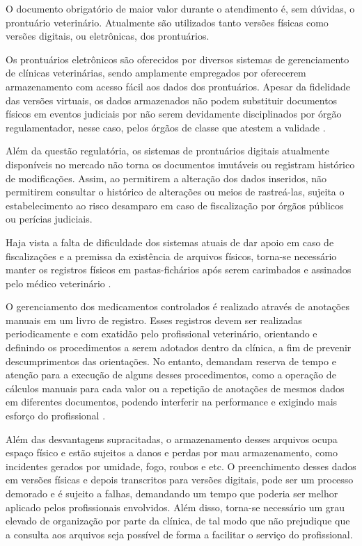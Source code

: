 \documentclass[
    12pt,               %
    openright,          %
    oneside,
    a4paper,            %
    BIBLATEX,           %
    TODO,               %
    english,            %
    brazil              %
    ]{ifsp-spo-inf-ctds}
\begin{document}
    O documento obrigatório de maior valor durante o atendimento é, sem dúvidas, o prontuário veterinário. Atualmente são utilizados tanto versões físicas como versões digitais, ou eletrônicas, dos prontuários.
    
    Os prontuários eletrônicos são oferecidos por diversos sistemas de gerenciamento de clínicas veterinárias, sendo amplamente empregados por oferecerem armazenamento com acesso fácil aos dados dos prontuários. Apesar da fidelidade das versões virtuais, os dados armazenados não podem substituir documentos físicos em eventos judiciais por não serem devidamente disciplinados por órgão regulamentador, nesse caso, pelos órgãos de classe que atestem a validade \cite{pe_dig} \cite{prontuario}.

    Além da questão regulatória, os sistemas de prontuários digitais atualmente disponíveis no mercado não torna os documentos imutáveis ou registram histórico de modificações. Assim, ao permitirem a alteração dos dados inseridos, não permitirem consultar o histórico de alterações ou meios de rastreá-las, sujeita o estabelecimento ao risco desamparo em caso de fiscalização por órgãos públicos ou perícias judiciais.
    
    Haja vista a falta de dificuldade dos sistemas atuais de dar apoio em caso de fiscalizações e a premissa da existência de arquivos físicos, torna-se necessário manter os registros físicos em pastas-fichários após serem carimbados e assinados pelo médico veterinário \cite{pe_dig}.
    
    O gerenciamento dos medicamentos controlados é realizado através de anotações manuais em um livro de registro. Esses registros devem ser realizadas periodicamente e com exatidão pelo profissional veterinário, orientando e definindo os procedimentos a serem adotados dentro da clínica, a fim de prevenir descumprimentos das orientações. No entanto, demandam reserva de tempo e atenção para a execução de alguns desses procedimentos, como a operação de cálculos manuais para cada valor ou a repetição de anotações de mesmos dados em diferentes documentos, podendo interferir na performance e exigindo mais esforço do profissional \cite{normativa}.
    
    Além das desvantagens supracitadas, o armazenamento desses arquivos ocupa espaço físico e estão sujeitos a danos e perdas por mau armazenamento, como incidentes gerados por umidade, fogo, roubos e etc. O preenchimento desses dados em versões físicas e depois transcritos para versões digitais, pode ser um processo demorado e é sujeito a falhas, demandando um tempo que poderia ser melhor aplicado pelos profissionais envolvidos. Além disso, torna-se necessário um grau elevado de organização por parte da clínica, de tal modo que não prejudique que a consulta aos arquivos seja possível de forma a facilitar o serviço do profissional\cite{pe_dig}.
\end{document}
